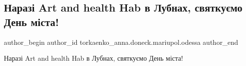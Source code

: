  
 
 
 
 

\subsection{Наразі Art and health Hab в Лубнах, святкуємо День міста!}
\label{sec:18_09_2022.fb.torkaenko_anna.doneck.mariupol.odessa.1.naraz__art_and_healt}

\ifcmt
 author_begin
   author_id torkaenko_anna.doneck.mariupol.odessa
 author_end
\fi

Наразі Art and health Hab в Лубнах, святкуємо День міста!
